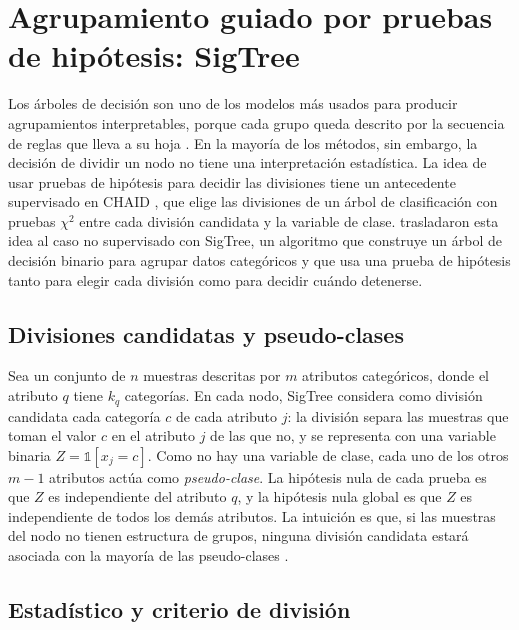 \section{Agrupamiento guiado por pruebas de hipótesis: SigTree}\label{sec:sigtree}

Los árboles de decisión son uno de los modelos más usados para producir
agrupamientos interpretables, porque cada grupo queda descrito por la secuencia de
reglas que lleva a su hoja \cite{Hu2025}. En la mayoría de los métodos, sin
embargo, la decisión de dividir un nodo no tiene una interpretación estadística.
La idea de usar pruebas de hipótesis para decidir las divisiones tiene un
antecedente supervisado en CHAID \cite{Kass1980}, que elige las divisiones de un
árbol de clasificación con pruebas $\chi^2$ entre cada división candidata y la
variable de clase. \cite{Hu2025} trasladaron esta idea al caso no supervisado con
SigTree, un algoritmo que construye un árbol de decisión binario para agrupar
datos categóricos y que usa una prueba de hipótesis tanto para elegir cada
división como para decidir cuándo detenerse.

\subsection{Divisiones candidatas y pseudo-clases}

Sea un conjunto de $n$ muestras descritas por $m$ atributos categóricos, donde el
atributo $q$ tiene $k_q$ categorías. En cada nodo, SigTree considera como división
candidata cada categoría $c$ de cada atributo $j$: la división separa las muestras
que toman el valor $c$ en el atributo $j$ de las que no, y se representa con una
variable binaria $Z = \mathbb{1}[x_j = c]$. Como no hay una variable de clase,
cada uno de los otros $m-1$ atributos actúa como \emph{pseudo-clase}. La hipótesis
nula de cada prueba es que $Z$ es independiente del atributo $q$, y la hipótesis
nula global es que $Z$ es independiente de todos los demás atributos. La intuición
es que, si las muestras del nodo no tienen estructura de grupos, ninguna división
candidata estará asociada con la mayoría de las pseudo-clases \cite[Sec.~3]{Hu2025}.

\subsection{Estadístico y criterio de división}

